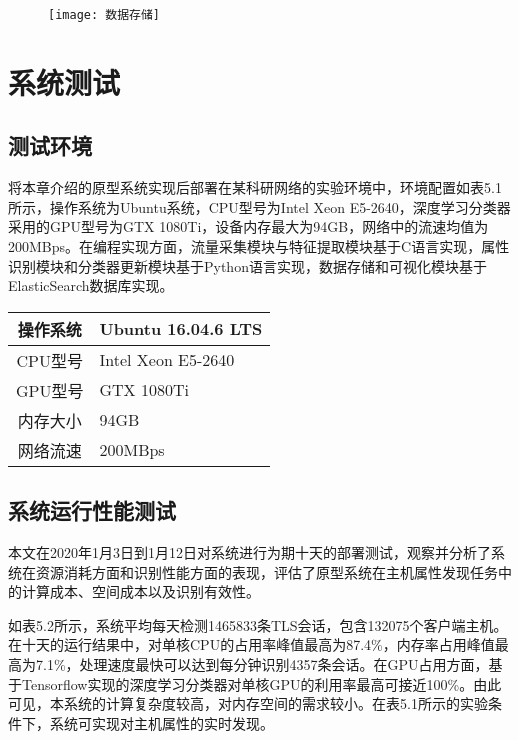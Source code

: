 \begin{figure}[!htbp]
    \centering
    \texttt{[image: 数据存储]}
\end{figure}

\section{系统测试}

\subsection{测试环境}

将本章介绍的原型系统实现后部署在某科研网络的实验环境中，环境配置如表5.1所示，操作系统为Ubuntu系统，CPU型号为Intel Xeon E5-2640，深度学习分类器采用的GPU型号为GTX 1080Ti，设备内存最大为94GB，网络中的流速均值为200MBps。在编程实现方面，流量采集模块与特征提取模块基于C语言实现，属性识别模块和分类器更新模块基于Python语言实现，数据存储和可视化模块基于ElasticSearch数据库实现。

\begin{table}[!h] 
    \centering
    \footnotesize
    \setlength{\tabcolsep}{25pt}
    \renewcommand{\arraystretch}{1}
\begin{tabular}{|c|l|}

\hline
操作系统 & Ubuntu 16.04.6 LTS \\ \hline
CPU型号 	& Intel Xeon E5-2640\\ \hline
GPU型号& GTX 1080Ti\\ \hline
内存大小& 94GB\\ \hline
网络流速 & 200MBps \\\hline

\end{tabular}
\end{table}

\subsection{系统运行性能测试}

本文在2020年1月3日到1月12日对系统进行为期十天的部署测试，观察并分析了系统在资源消耗方面和识别性能方面的表现，评估了原型系统在主机属性发现任务中的计算成本、空间成本以及识别有效性。

如表5.2所示，系统平均每天检测1465833条TLS会话，包含132075个客户端主机。在十天的运行结果中，对单核CPU的占用率峰值最高为87.4\%，内存率占用峰值最高为7.1\%，处理速度最快可以达到每分钟识别4357条会话。在GPU占用方面，基于Tensorflow实现的深度学习分类器对单核GPU的利用率最高可接近100\%。由此可见，本系统的计算复杂度较高，对内存空间的需求较小。在表5.1所示的实验条件下，系统可实现对主机属性的实时发现。

